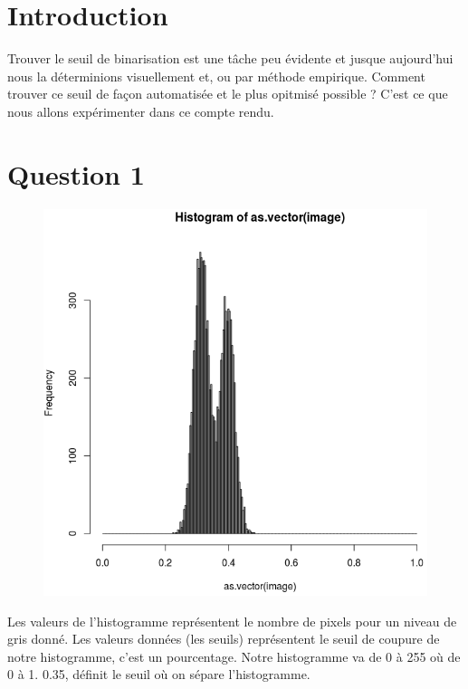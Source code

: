 \documentclass[a4paper,12pt]{report}
\begin{document}


\setcounter{page}{1} 
\newpage

\section*{Introduction}

Trouver le seuil de binarisation est une tâche peu évidente et jusque aujourd'hui nous la déterminions visuellement et, ou par méthode empirique. Comment trouver ce seuil de façon automatisée	 et le plus opitmisé possible ? 
C'est ce que nous allons expérimenter dans ce compte rendu.
	
\section*{Question 1}

\begin{figure}[!ht]
	\center
	\includegraphics[scale=0.3]{image/histo.png}
\end{figure}

Les valeurs de l'histogramme représentent le nombre de pixels pour un niveau de gris donné. Les valeurs données (les seuils) représentent le seuil de coupure de notre histogramme, c'est un pourcentage. Notre histogramme va de 0 à 255 où de 0 à 1. 0.35, définit le seuil où on sépare l'histogramme.\\
\end{document}
